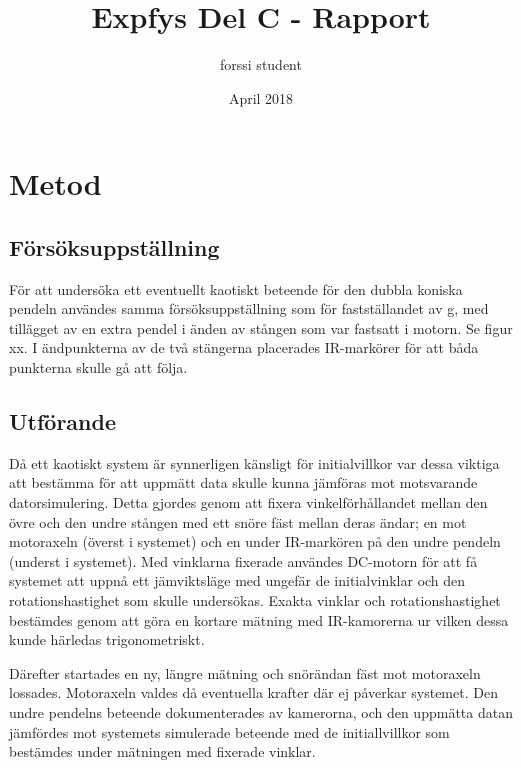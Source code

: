 \documentclass{article}
\title{Expfys Del C - Rapport}
\author{forssi student}
\date{April 2018}
\begin{document}
\maketitle

\section{Metod}

\subsection{Försöksuppställning}


För att undersöka ett eventuellt kaotiskt beteende för den dubbla koniska pendeln användes samma försöksuppställning som för fastställandet av g, med tillägget av en extra pendel i änden av stången som var fastsatt i motorn. Se figur xx. I ändpunkterna av de två stängerna placerades IR-markörer för att båda punkterna skulle gå att följa.

\subsection{Utförande}

Då ett kaotiskt system är synnerligen känsligt för initialvillkor var dessa viktiga att bestämma för att uppmätt data skulle kunna jämföras mot motsvarande datorsimulering. Detta gjordes genom att fixera vinkelförhållandet mellan den övre och den undre stången med ett snöre fäst mellan deras ändar; en mot motoraxeln (överst i systemet) och en under IR-markören på den undre pendeln (underst i systemet). Med vinklarna fixerade användes DC-motorn för att få systemet att uppnå ett jämviktsläge med ungefär de initialvinklar och den rotationshastighet som skulle undersökas. Exakta vinklar och rotationshastighet bestämdes genom att göra en kortare mätning med IR-kamorerna ur vilken dessa kunde härledas trigonometriskt. 

Därefter startades en ny, längre mätning och snörändan fäst mot motoraxeln lossades. Motoraxeln valdes då eventuella krafter där ej påverkar systemet. Den undre pendelns beteende dokumenterades av kamerorna, och den uppmätta datan jämfördes mot systemets simulerade beteende med de initiallvillkor som bestämdes under mätningen med fixerade vinklar. 
\end{document}

